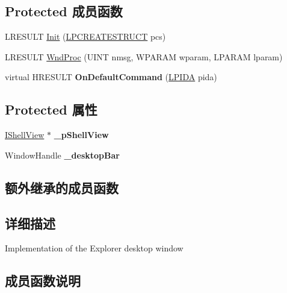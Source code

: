 \subsection*{Protected 成员函数}
\begin{DoxyCompactItemize}
\item 
L\+R\+E\+S\+U\+LT \hyperlink{struct_desktop_window_a4733a9617d8acbcc3e64ca8edb2a6b30}{Init} (\hyperlink{structtag_c_r_e_a_t_e_s_t_r_u_c_t_a}{L\+P\+C\+R\+E\+A\+T\+E\+S\+T\+R\+U\+CT} pcs)
\item 
L\+R\+E\+S\+U\+LT \hyperlink{struct_desktop_window_aef29a0eb3bfc089a83ad8627c2ecadaf}{Wnd\+Proc} (U\+I\+NT nmsg, W\+P\+A\+R\+AM wparam, L\+P\+A\+R\+AM lparam)
\item 
\mbox{\label{struct_desktop_window_a168965fb0a82230b99f1e11c4f365d78}} 
virtual H\+R\+E\+S\+U\+LT {\bfseries On\+Default\+Command} (\hyperlink{struct_c_i_d_a}{L\+P\+I\+DA} pida)
\end{DoxyCompactItemize}
\subsection*{Protected 属性}
\begin{DoxyCompactItemize}
\item 
\mbox{\label{struct_desktop_window_a46cc1655166de448e4589c92a24c73ac}} 
\hyperlink{interface_i_shell_view}{I\+Shell\+View} $\ast$ {\bfseries \+\_\+p\+Shell\+View}
\item 
\mbox{\label{struct_desktop_window_ad0431b4556422d4a742ab9fa9f805fe5}} 
Window\+Handle {\bfseries \+\_\+desktop\+Bar}
\end{DoxyCompactItemize}
\subsection*{额外继承的成员函数}


\subsection{详细描述}
Implementation of the Explorer desktop window 

\subsection{成员函数说明}
\mbox{\label{struct_desktop_window_a4733a9617d8acbcc3e64ca8edb2a6b30}} 
